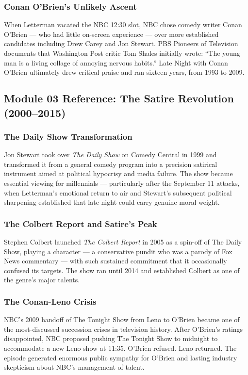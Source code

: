 \documentclass[11pt,letterpaper]{article}
\begin{document}
\subsubsection{Conan O'Brien's Unlikely Ascent}
When Letterman vacated the NBC 12:30 slot, NBC chose comedy writer Conan O'Brien --- who had little on-screen experience --- over more established candidates including Drew Carey and Jon Stewart. PBS Pioneers of Television documents that Washington Post critic Tom Shales initially wrote: ``The young man is a living collage of annoying nervous habits.'' Late Night with Conan O'Brien ultimately drew critical praise and ran sixteen years, from 1993 to 2009.

\subsection{Module 03 Reference: The Satire Revolution (2000--2015)}

\subsubsection{The Daily Show Transformation}
Jon Stewart took over \textit{The Daily Show} on Comedy Central in 1999 and transformed it from a general comedy program into a precision satirical instrument aimed at political hypocrisy and media failure. The show became essential viewing for millennials --- particularly after the September 11 attacks, when Letterman's emotional return to air and Stewart's subsequent political sharpening established that late night could carry genuine moral weight.

\subsubsection{The Colbert Report and Satire's Peak}
Stephen Colbert launched \textit{The Colbert Report} in 2005 as a spin-off of The Daily Show, playing a character --- a conservative pundit who was a parody of Fox News commentary --- with such sustained commitment that it occasionally confused its targets. The show ran until 2014 and established Colbert as one of the genre's major talents.

\subsubsection{The Conan-Leno Crisis}
NBC's 2009 handoff of The Tonight Show from Leno to O'Brien became one of the most-discussed succession crises in television history. After O'Brien's ratings disappointed, NBC proposed pushing The Tonight Show to midnight to accommodate a new Leno show at 11:35. O'Brien refused. Leno returned. The episode generated enormous public sympathy for O'Brien and lasting industry skepticism about NBC's management of talent.
\end{document}
